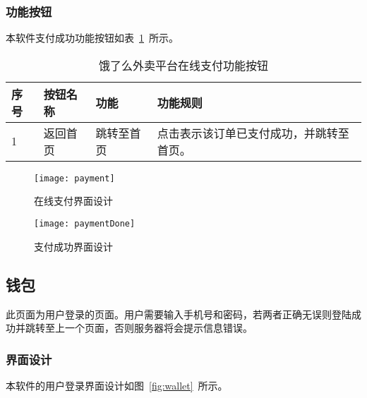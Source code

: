 \subsubsection{功能按钮}
本软件支付成功功能按钮如表~\ref{tab:table7}~所示。
\begin{table}[htbp]
    \caption{饿了么外卖平台在线支付功能按钮}\label{tab:table7}
    \vspace{0.5em}\wuhao
    \begin{tabularx}{\textwidth}{lllX}
    \toprule[1.5pt]
    序号 & 按钮名称 & 功能 & 功能规则 \\ 
    \midrule[1pt]
    1 & 返回首页 & 跳转至首页 & 点击表示该订单已支付成功，并跳转至首页。 \\
\bottomrule[1.5pt]
\end{tabularx}
\vspace{\baselineskip}
\end{table}
\begin{figure}[htbp]
    \centering
    \begin{minipage}{0.4\textwidth}
    \centering
    \texttt{[image: payment]}
    \caption{在线支付界面设计}\label{fig:payment}
    \end{minipage}
    \begin{minipage}{0.4\textwidth}
    \centering
    \texttt{[image: paymentDone]}
    \caption{支付成功界面设计}\label{fig:paymentDone}
    \end{minipage}
    \vspace{\baselineskip}
\end{figure}

\subsection{钱包}
此页面为用户登录的页面。用户需要输入手机号和密码，若两者正确无误则登陆成功并跳转至上一个页面，否则服务器将会提示信息错误。
\subsubsection{界面设计}
本软件的用户登录界面设计如图~\ref{fig:wallet}~所示。
